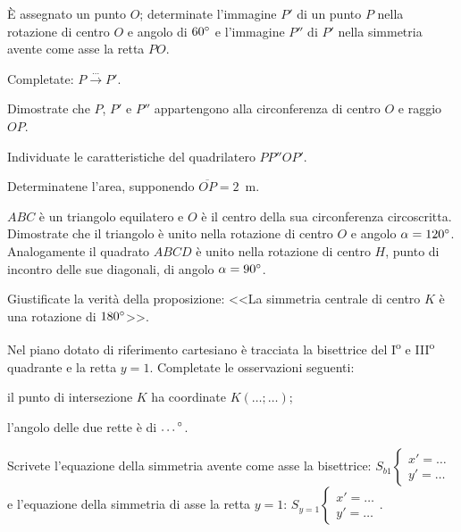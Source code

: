 \begin{esercizio}
\label{ese:8.66} %
\`E assegnato un punto $O$; determinate l'immagine $P'$ di un punto $P$ nella rotazione di centro $O$ e angolo di $60{}^{\circ}$ e l'immagine $P''$ di $P'$ nella simmetria avente come asse la retta $PO$.
\begin{enumeratea}
\item Completate: $P \overset{\ldots{}}\longrightarrow P'$. 
\item Dimostrate che $P$, $P'$ e $P''$ appartengono alla circonferenza di centro $O$ e raggio $OP$.
\item Individuate le caratteristiche del quadrilatero $PP''OP'$.
\item Determinatene l'area, supponendo $\overline{OP}=2$~m.
\end{enumeratea}
\end{esercizio}

\begin{esercizio}
\label{ese:8.67} %
$ABC$ è un triangolo equilatero e $O$ è il centro della sua circonferenza circoscritta. Dimostrate che il triangolo è unito nella rotazione di centro $O$ e angolo $\alpha=120{}^{\circ}$. Analogamente il quadrato $ABCD$ è unito nella rotazione di centro $H$, punto di incontro delle sue diagonali, di angolo $\alpha=90{}^{\circ}$.
\end{esercizio}

\begin{esercizio}
\label{ese:8.68} %
Giustificate la verità della proposizione: <<La simmetria centrale di centro $K$ è una rotazione di $180{}^{\circ}$>>.
\end{esercizio}

\begin{esercizio}
\label{ese:8.69} %
Nel piano dotato di riferimento cartesiano è tracciata la bisettrice del I\textsuperscript{o} e III\textsuperscript{o} quadrante e la retta $y=1$. Completate le osservazioni seguenti:
\begin{enumeratea}
\item il punto di intersezione $K$ ha coordinate $K(\ldots{};\ldots{})$;
\item l'angolo delle due rette è di $\ldots{}{}^{\circ}$.
\end{enumeratea}
\end{esercizio}

\begin{esercizio}
\label{ese:8.70} %
Scrivete l'equazione della simmetria avente come asse la bisettrice: $S_{b1}\begin{cases}x'=\ldots{}\\y'=\ldots{}\end{cases}$ e l'equazione della simmetria di asse la retta $y=1$: $S_{y=1}\begin{cases}x'=\ldots{}\\y'=\ldots{}\end{cases}$.
\end{esercizio}


